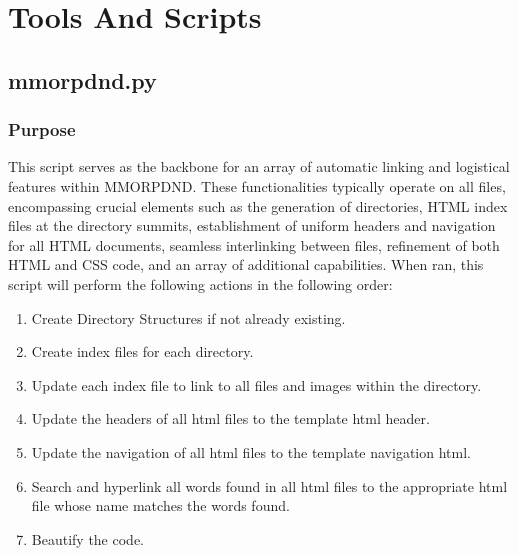 \chapter{Tools And Scripts}
\thispagestyle{fancy}  %


















\section{mmorpdnd.py}

\subsection{Purpose}

This script serves as the backbone for an array of automatic linking and logistical features within MMORPDND. These functionalities typically operate on all files, encompassing crucial elements such as the generation of directories, HTML index files at the directory summits, establishment of uniform headers and navigation for all HTML documents, seamless interlinking between files, refinement of both HTML and CSS code, and an array of additional capabilities. When ran, this script will perform the following actions in the following order:

\begin{enumerate}
	\item Create Directory Structures if not already existing.
	\item Create index files for each directory.
	\item Update each index file to link to all files and images within the directory.
	\item Update the headers of all html files to the template html header.
	\item Update the navigation of all html files to the template navigation html.
	\item Search and hyperlink all words found in all html files to the appropriate html file whose name matches the words found.
	\item Beautify the code.
\end{enumerate}







